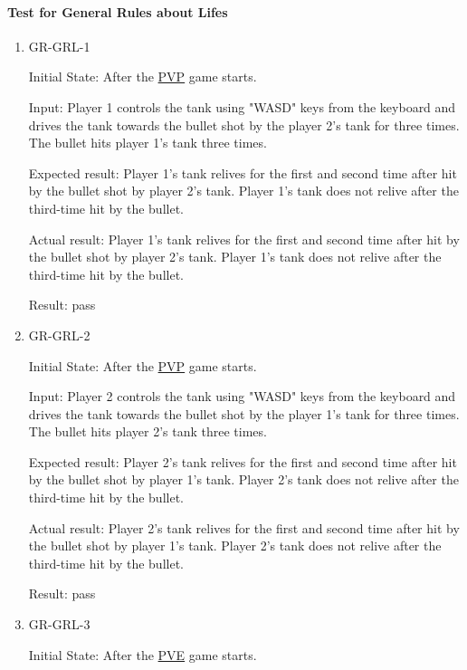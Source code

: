 \documentclass[12pt, titlepage]{article}
\begin{document}
\paragraph{Test for General Rules about Lifes}

\begin{enumerate}

\item{GR-GRL-1\\}
					
Initial State: After the \underline{PVP} game starts. 
					
Input: Player 1 controls the tank using "WASD" keys from the keyboard and drives the tank towards the bullet shot by the player 2's tank for three times. The bullet hits player 1's tank three times.
					
Expected result: Player 1's tank relives for the first and second time after hit by the bullet shot by player 2's tank. Player 1's tank does not relive after the third-time hit by the bullet.
					
Actual result: Player 1's tank relives for the first and second time after hit by the bullet shot by player 2's tank. Player 1's tank does not relive after the third-time hit by the bullet.

Result: pass

\item{GR-GRL-2\\}
					
Initial State: After the \underline{PVP} game starts.
					
Input: Player 2 controls the tank using "WASD" keys from the keyboard and drives the tank towards the bullet shot by the player 1's tank for three times. The bullet hits player 2's tank three times.
					
Expected result: Player 2's tank relives for the first and second time after hit by the bullet shot by player 1's tank. Player 2's tank does not relive after the third-time hit by the bullet.
					
Actual result: Player 2's tank relives for the first and second time after hit by the bullet shot by player 1's tank. Player 2's tank does not relive after the third-time hit by the bullet.

Result: pass

\item{GR-GRL-3\\}
					
Initial State: After the \underline{PVE} game starts.
					

\end{enumerate}
\end{document}

